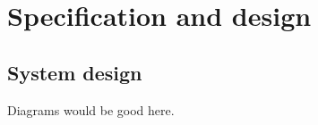 \chapter{Specification and design}
\label{ch:specification}


\section{System design}

Diagrams would be good here.
